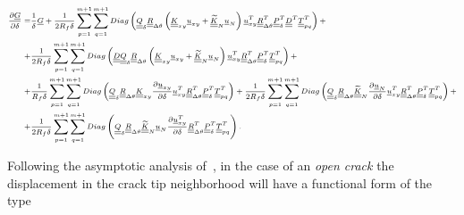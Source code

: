 \documentclass[review]{elsarticle}
\begin{document}
\begin{equation}\label{eq:Gdev}
\scriptsize
\begin{split}
\frac{\partial \underline{G}}{\partial \delta}=&\frac{1}{\delta}\underline{G}+\frac{1}{2R_{f}\delta}\sum_{p=1}^{m+1}\sum_{q=1}^{m+1}Diag\left(\underline{\underline{Q}}_{\delta}\underline{\underline{R}}_{\Delta\theta}\left(\underline{\underline{K}}_{xy}\underline{u}_{xy}+\underline{\underline{\widetilde{K}}}_{N}\underline{u}_{N}\right)\underline{u}_{xy}^{T}\underline{\underline{R}}_{\Delta\theta}^{T}\underline{\underline{P}}_{\delta}^{T}\underline{\underline{D}}^{T}\underline{\underline{T}}_{pq}^{T}\right)+\\
+&\frac{1}{2R_{f}\delta}\sum_{p=1}^{m+1}\sum_{q=1}^{m+1}Diag\left(\underline{\underline{D}}\underline{\underline{Q}}_{\delta}\underline{\underline{R}}_{\Delta\theta}\left(\underline{\underline{K}}_{xy}\underline{u}_{xy}+\underline{\underline{\widetilde{K}}}_{N}\underline{u}_{N}\right)\underline{u}_{xy}^{T}\underline{\underline{R}}_{\Delta\theta}^{T}\underline{\underline{P}}_{\delta}^{T}\underline{\underline{T}}_{pq}^{T}\right)+\\
+&\frac{1}{R_{f}\delta}\sum_{p=1}^{m+1}\sum_{q=1}^{m+1}Diag\left(\underline{\underline{Q}}_{\delta}\underline{\underline{R}}_{\Delta\theta}\underline{\underline{K}}_{xy}\frac{\partial \underline{u}_{xy}}{\partial \delta}\underline{u}_{xy}^{T}\underline{\underline{R}}_{\Delta\theta}^{T}\underline{\underline{P}}_{\delta}^{T}\underline{\underline{T}}_{pq}^{T}\right)+\frac{1}{2R_{f}\delta}\sum_{p=1}^{m+1}\sum_{q=1}^{m+1}Diag\left(\underline{\underline{Q}}_{\delta}\underline{\underline{R}}_{\Delta\theta}\underline{\underline{\widetilde{K}}}_{N}\frac{\partial \underline{u}_{N}}{\partial \delta}\underline{u}_{xy}^{T}\underline{\underline{R}}_{\Delta\theta}^{T}\underline{\underline{P}}_{\delta}^{T}\underline{\underline{T}}_{pq}^{T}\right)+\\
+&\frac{1}{2R_{f}\delta}\sum_{p=1}^{m+1}\sum_{q=1}^{m+1}Diag\left(\underline{\underline{Q}}_{\delta}\underline{\underline{R}}_{\Delta\theta}\underline{\underline{\widetilde{K}}}_{N}\underline{u}_{N}\frac{\partial \underline{u}_{xy}^{T}}{\partial \delta}\underline{\underline{R}}_{\Delta\theta}^{T}\underline{\underline{P}}_{\delta}^{T}\underline{\underline{T}}_{pq}^{T}\right).
\end{split}
\end{equation}

Following the asymptotic analysis of~\cite{Williams1959,Comninou1990}, in the case of an \emph{open crack} the displacement in the crack tip neighborhood will have a functional form of the type
\end{document}
